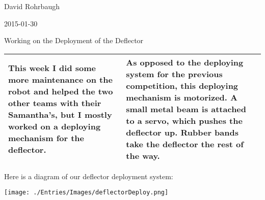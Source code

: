David Rohrbaugh

2015-01-30

Working on the Deployment of the Deflector

\begin{tabular}{|p{5cm}|p{5cm}|}
 \hline
 This week I did some more maintenance on the robot and helped the two other teams with their Samantha's, but I mostly worked on a deploying mechanism for the deflector.
 &
 As opposed to the deploying system for the previous competition, this deploying mechanism is motorized. A small metal beam is attached to a servo, which pushes the deflector up. Rubber bands take the deflector the rest of the way.
 \\
 \hline
\end{tabular}

\medskip

Here is a diagram of our deflector deployment system:

\begin{center}
 \texttt{[image: ./Entries/Images/deflectorDeploy.png]}
\end{center}
